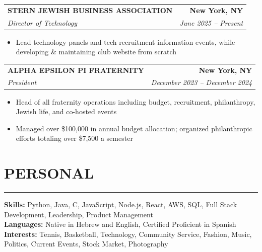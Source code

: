 \documentclass[letterpaper,10pt]{article}
\makeatletter
\newcommand{\sectionline}{\vspace{1pt}\hrule\vspace{4pt}}
\newcommand{\resumeSubheading}[4]{%
  \vspace{2pt}
  \begin{tabular*}{\textwidth}{@{\extracolsep{\fill}} l r}
    \textbf{#1} & \textbf{#2} \\
    \textit{#3} & \textit{#4} \\
  \end{tabular*}
}
\newcommand{\resumeItem}[1]{\item #1}
\newcommand{\resumeItemListStart}{\begin{itemize}}
\newcommand{\resumeItemListEnd}{\end{itemize}}
\makeatother
\begin{document}
\resumeSubheading
  {STERN JEWISH BUSINESS ASSOCIATION}{New York, NY}
  {Director of Technology}{June 2025 -- Present}
\resumeItemListStart
  \resumeItem{Lead technology panels and tech recruitment information events, while developing \& maintaining club website from scratch}
\resumeItemListEnd

\resumeSubheading
  {ALPHA EPSILON PI FRATERNITY}{New York, NY}
  {President}{December 2023 -- December 2024}
\resumeItemListStart
  \resumeItem{Head of all fraternity operations including budget, recruitment, philanthropy, Jewish life, and co-hosted events}
  \resumeItem{Managed over \$100,000 in annual budget allocation; organized philanthropic efforts totaling over \$7,500 a semester}
\resumeItemListEnd

\section*{PERSONAL}
\sectionline
\textbf{Skills:} Python, Java, C, JavaScript, Node.js, React, AWS, SQL, Full Stack Development, Leadership, Product Management\\
\textbf{Languages:} Native in Hebrew and English, Certified Proficient in Spanish\\
\textbf{Interests:} Tennis, Basketball, Technology, Community Service, Fashion, Music, Politics, Current Events, Stock Market, Photography
\end{document}
